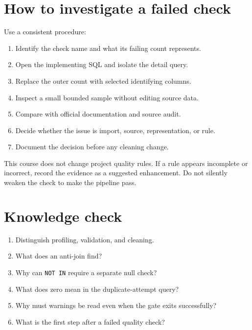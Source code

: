 \section{How to investigate a failed check}

Use a consistent procedure:
\begin{enumerate}
  \item Identify the check name and what its failing count represents.
  \item Open the implementing SQL and isolate the detail query.
  \item Replace the outer count with selected identifying columns.
  \item Inspect a small bounded sample without editing source data.
  \item Compare with official documentation and source audit.
  \item Decide whether the issue is import, source, representation, or rule.
  \item Document the decision before any cleaning change.
\end{enumerate}

\begin{editionnote}
This course does not change project quality rules. If a rule appears incomplete
or incorrect, record the evidence as a suggested enhancement. Do not silently
weaken the check to make the pipeline pass.
\end{editionnote}

\section{Knowledge check}

\begin{enumerate}
  \item Distinguish profiling, validation, and cleaning.
  \item What does an anti-join find?
  \item Why can \texttt{NOT IN} require a separate null check?
  \item What does zero mean in the duplicate-attempt query?
  \item Why must warnings be read even when the gate exits successfully?
  \item What is the first step after a failed quality check?
\end{enumerate}

